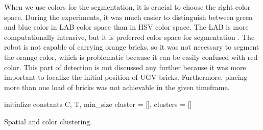 When we use colors for the segmentation, it is crucial to choose the right color space. During the experiments, it was much easier to distinguish between green and blue color in LAB color space than in HSV color space. The LAB is more computationally intensive, but it is preferred color space for segmentation \cite{wang2014}. The robot is not capable of carrying orange bricks, so it was not necessary to segment the orange color, which is problematic because it can be easily confused with red color. This part of detection is not discussed any further because it was more important to localize the initial position of UGV bricks. Furthermore, placing more than one load of bricks was not achievable in the given timeframe.

\begin{algorithm}[H]
	initialize constants C, T, min\_size \;
	cluster = [], 	clusters = []\;
	\caption{Spatial and color clustering.}
	\label{alg:clustering}
\end{algorithm}

